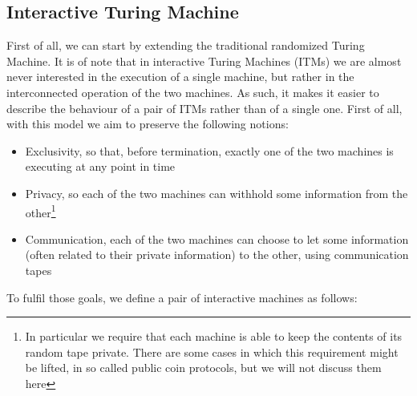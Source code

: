 \documentclass{article}
\begin{document}
\subsection{Interactive Turing Machine}
First of all, we can start by extending the traditional randomized Turing Machine. It is of note that in interactive Turing Machines (ITMs) we are almost never interested in the execution of a single machine, but rather in the interconnected operation of the two machines. As such, it makes it easier to describe the behaviour of a pair of ITMs rather than of a single one. First of all, with this model we aim to preserve the following notions:
\begin{itemize}
    \item Exclusivity, so that, before termination, exactly one of the two machines is executing at any point in time
    \item Privacy, so each of the two machines can withhold some information from the other\footnote{In particular we require that each machine is able to keep the contents of its random tape private. There are some cases in which this requirement might be lifted, in so called public coin protocols, but we will not discuss them here}
    \item Communication, each of the two machines can choose to let some information (often related to their private information) to the other, using communication tapes
\end{itemize}
To fulfil those goals, we define a pair of interactive machines as follows:
\end{document}
